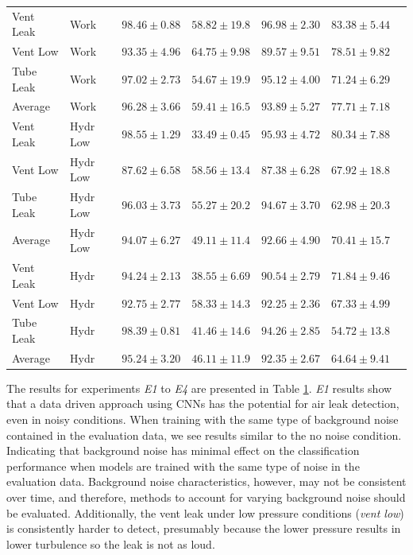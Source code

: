 \begin{table}[h]
\begin{tabular}{l l c c c c c}
    Vent Leak & Work & $98.46\pm0.88$ & $58.82\pm19.8$ & $96.98\pm2.30$ & $83.38\pm5.44$ \\
    Vent Low  & Work & $93.35\pm4.96$ & $64.75\pm9.98$ & $89.57\pm9.51$ & $78.51\pm9.82$ \\
    Tube Leak & Work & $97.02\pm2.73$ & $54.67\pm19.9$ & $95.12\pm4.00$ & $71.24\pm6.29$ \\ \midrule
    Average   & Work & $96.28\pm3.66$ & $59.41\pm16.5$ & $93.89\pm5.27$ & $77.71\pm7.18$ \\ \midrule
    
    Vent Leak & Hydr Low & $98.55\pm1.29$ & $33.49\pm0.45$ & $95.93\pm4.72$ & $80.34\pm7.88$ \\
    Vent Low  & Hydr Low & $87.62\pm6.58$ & $58.56\pm13.4$ & $87.38\pm6.28$ & $67.92\pm18.8$ \\
    Tube Leak & Hydr Low & $96.03\pm3.73$ & $55.27\pm20.2$ & $94.67\pm3.70$ & $62.98\pm20.3$ \\ \midrule
    Average   & Hydr Low & $94.07\pm6.27$ & $49.11\pm11.4$ & $92.66\pm4.90$ & $70.41\pm15.7$ \\ \midrule
    
    Vent Leak & Hydr & $94.24\pm2.13$ & $38.55\pm6.69$ & $90.54\pm2.79$ & $71.84\pm9.46$ \\
    Vent Low  & Hydr & $92.75\pm2.77$ & $58.33\pm14.3$ & $92.25\pm2.36$ & $67.33\pm4.99$ \\ 
    Tube Leak & Hydr & $98.39\pm0.81$ & $41.46\pm14.6$ & $94.26\pm2.85$ & $54.72\pm13.8$ \\\midrule
    Average   & Hydr & $95.24\pm3.20$ & $46.11\pm11.9$ & $92.35\pm2.67$ & $64.64\pm9.41$ \\
    
    \bottomrule
    \end{tabular}
	\label{tab:noise-train}
\end{table}

The results for experiments \textit{E1} to \textit{E4} are presented in Table \ref{tab:noise-train}. \textit{E1} results show that a data driven approach using CNNs has the potential for air leak detection, even in noisy conditions. 
When training with the same type of background noise contained in the evaluation data, we see results similar to the no noise condition. 
Indicating that background noise has minimal effect on the classification performance when models are trained with the same type of noise in the evaluation data. Background noise characteristics, however, may not be consistent over time, and therefore, methods to account for varying background noise should be evaluated. Additionally, the vent leak under low pressure conditions (\textit{vent low}) is consistently harder to detect, presumably because the lower pressure results in lower turbulence so the leak is not as loud.

